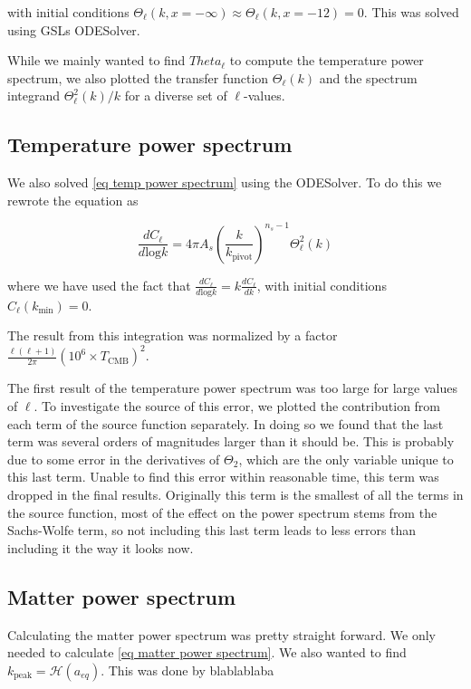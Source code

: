 \documentclass[12pt]{article}
\begin{document}
with initial conditions $\Theta_{\ell}(k, x=-\infty) \approx \Theta_{\ell}(k, x=-12) = 0$. This was solved using GSLs ODESolver.

While we mainly wanted to find $Theta_{\ell}$ to compute the temperature power spectrum, we also plotted the transfer function $\Theta_{\ell}(k)$ and the spectrum integrand $\Theta_{\ell}^2(k)/k$ for a diverse set of $\ell$-values.

\subsection{Temperature power spectrum}
We also solved \cref{eq temp power spectrum} using the ODESolver. To do this we rewrote the equation as

\begin{equation}
    \frac{dC_{\ell}}{d\mathrm{log}k}= 4\pi A_{s}\left(\frac{k}{k_{\mathrm{pivot}}}\right)^{n_{s}-1} \Theta_{\ell}^{2}(k) 
\end{equation}

where we have used the fact that $\frac{dC_{\ell}}{d\mathrm{log}k} = k\frac{dC_{\ell}}{dk}$, with initial conditions $C_{\ell}(k_{\mathrm{min}}) = 0$. 

The result from this integration was normalized by a factor $\frac{\ell(\ell + 1)}{2\pi}(10^6 \times T_{\mathrm{CMB}})^2.$

The first result of the temperature power spectrum was too large for large values of $\ell$. To investigate the source of this error, we plotted the contribution from each term of the source function separately. In doing so we found that the last term was several orders of magnitudes larger than it should be. This is probably due to some error in the derivatives of $\Theta_2$, which are the only variable unique to this last term. Unable to find this error within reasonable time, this term was dropped in the final results. Originally this term is the smallest of all the terms in the source function, most of the effect on the power spectrum stems from the Sachs-Wolfe term, so not including this last term leads to less errors than including it the way it looks now.

\subsection{Matter power spectrum}
Calculating the matter power spectrum was pretty straight forward. We only needed to calculate \cref{eq matter power spectrum}. We also wanted to find $k_{\mathrm{peak}} = \mathcal{H}(a_{eq}).$ This was done by blablablaba
\end{document}
